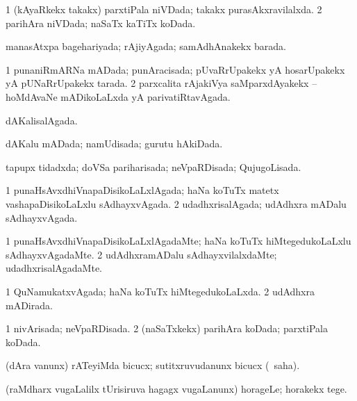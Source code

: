 \bentry
{} 
\gl{\gu}
\expl{}
\bmng
\bnum
\num{1} (kAyaRkekx takakx) parxtiPala niVDada; takakx purasAkxravilalxda. 
\num{2} parihAra niVDada; naSaTx kaTiTx koDada. 
\enum
\emng
\eentry

\bentry
{} 
\gl{\gu}
\expl{}
\bmng
manasAtxpa bagehariyada; rAjiyAgada; samAdhAnakekx barada. 
\emng
\eentry

\bentry
{} 
\gl{\gu}
\expl{}
\bmng
\bnum
\num{1} punaniRmARNa mADada; punAracisada; pUvaRrUpakekx yA hosarUpakekx yA pUNaRrUpakekx tarada. 
\num{2} parxcalita rAjakiVya saMparxdAyakekx -- hoMdAvaNe mADikoLaLxda yA parivatiRtavAgada. 
\enum
\emng
\eentry

\bentry
{} 
\gl{\gu}
\expl{}
\bmng
dAKalisalAgada. 
\emng
\eentry

\bentry
{} 
\gl{\gu}
\expl{}
\bmng
dAKalu mADada; namUdisada; gurutu hAkiDada. 
\emng
\eentry

\bentry
{} 
\gl{\gu}
\expl{}
\bmng
tapupx tidadxda; doVSa pariharisada; neVpaRDisada; QujugoLisada. 
\emng
\eentry

\bentry
{} 
\gl{\gu}
\expl{}
\bmng
\bnum
\num{1} punaHsAvxdhiVnapaDisikoLaLxlAgada; haNa koTuTx matetx vashapaDisikoLaLxlu sAdhayxvAgada. 
\num{2} udadhxrisalAgada; udAdhxra mADalu sAdhayxvAgada. 
\enum
\emng
\eentry

\bentry
{} 
\gl{\kirxvi}
\expl{}
\bmng
\bnum
\num{1} punaHsAvxdhiVnapaDisikoLaLxlAgadaMte; haNa koTuTx hiMtegedukoLaLxlu sAdhayxvAgadaMte. 
\num{2} udAdhxramADalu sAdhayxvilalxdaMte; udadhxrisalAgadaMte. 
\enum
\emng
\eentry

\bentry
{} 
\gl{\gu}
\expl{}
\bmng
\bnum
\num{1} QuNamukatxvAgada; haNa koTuTx hiMtegedukoLaLxda. 
\num{2} udAdhxra mADirada. 
\enum
\emng
\eentry

\bentry
{} 
\gl{\gu}
\expl{}
\bmng
\bnum
\num{1} nivArisada; neVpaRDisada. 
\num{2} (naSaTxkekx) parihAra koDada; parxtiPala koDada. 
\enum
\emng
\eentry

\bentry
{} 
\gl{\sakirx}
\expl{}
\bmng
(dAra \mo vanunx) rATeyiMda bicucx; sutitxruvudanunx bicucx (\akirx\ saha). 
\emng
\eentry

\bentry
{} 
\gl{\sakirx}
\bmng
(raMdharx \mo vugaLalilx tUrisiruva hagagx \mo vugaLanunx) horageLe; horakekx tege. 
\emng
\eentry

